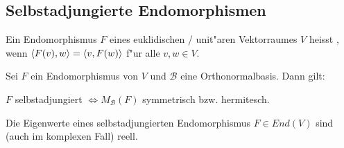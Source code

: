 \documentclass[9pt, a4paper, twocolumn, landscape]{article}
\newcommand{\comment}[1]{}
\begin{document}
\comment{
\begin{lemma}
Zu einem orthogonalen Endomorphismus \(F\) eines endlichdimensionalen euklidischen Vektorraumes \(V\) mit $dim (V) \geq 1\) gibt es immer einen Untervektorraum \(W \subset V\) mit
$
F(W) \subset W \text { und } 1 \leq dim (W) \leq 2 .
$
\end{lemma}
}



\subsection{Selbstadjungierte Endomorphismen}

\comment{
\begin{definition}
Der zu einem Endomorphismus $F$ eines euklidischen / unit"aren Vektorraumes $V$ \bt{adjungierte Endomorphismus} $F^{ad} \in End(V)$ ist definiert durch:
$$
\scp{F(v)}{w} = \scp{v}{F^{ad}(w)}
$$
f"ur alle $v, w \in V$.
\end{definition}


\begin{remark}
Sei $\mathcal{B}$ eine Orthonormalbasis von $V$, $F$ ein Endomorphismus und $A = M_\mathcal{B}(F)$. Dann ist der adjungierte Endormorphismus von $F$ eindeutig gegeben durch $M_\mathcal{B}(F^{ad}) = A^\dagger$.
\end{remark}
}

\begin{definition}
Ein Endomorphismus $F$ eines euklidischen / unit"aren Vektorraumes $V$ heisst , wenn $\left\langle {F(v)} , {w} \right\rangle = \left\langle {v} , {F(w)} \right\rangle$ f"ur alle $v, w \in V$.
\end{definition}

\begin{theorem}
Sei $F$ ein Endomorphismus von \(V\) und \(\mathcal{B}\) eine Orthonormalbasis. Dann gilt: 

\(F\) selbstadjungiert $\Leftrightarrow M_{\mathcal{B}}(F)$ symmetrisch bzw. hermitesch.
\end{theorem}

\begin{lemma}
Die Eigenwerte eines selbstadjungierten Endomorphismus $F \in End(V)$ sind (auch im komplexen Fall) reell. 
\end{lemma}
\end{document}
